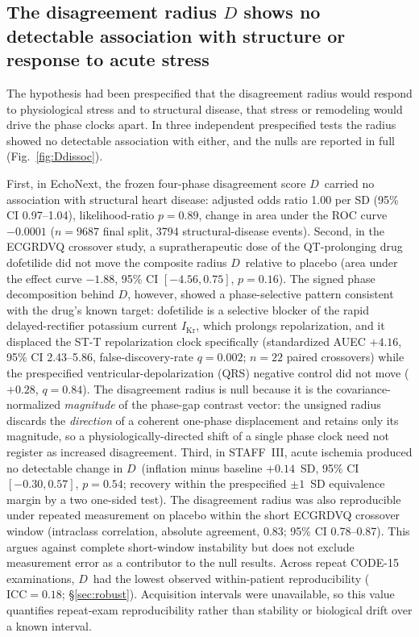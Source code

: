 \documentclass[11pt]{article}
\newcommand{\D}{\ensuremath{D}}
\begin{document}
\subsection{The disagreement radius \texorpdfstring{\D}{D} shows no detectable association with structure or response to acute stress}
\label{sec:dissociation}

The hypothesis had been prespecified that the disagreement radius would respond to
physiological stress and to structural disease, that stress or remodeling would drive
the phase clocks apart. In three independent prespecified tests the radius showed no
detectable association with either, and the nulls are reported in full (Fig.~\ref{fig:Ddissoc}).

First, in EchoNext, the frozen four-phase disagreement score \D\ carried no
association with structural heart disease: adjusted odds ratio \num{1.00} per SD (95\%
CI \numrange{0.97}{1.04}), likelihood-ratio $p=\num{0.89}$, change in area under the
ROC curve $-\num{0.0001}$ ($n=\num{9687}$ final split, \num{3794} structural-disease
events). Second, in the ECGRDVQ crossover study, a supratherapeutic dose of the
QT-prolonging drug dofetilide did not move the composite radius \D\ relative to placebo (area under the
effect curve $-\num{1.88}$, 95\% CI $[-\num{4.56},\num{0.75}]$, $p=\num{0.16}$).
The signed phase decomposition behind \D, however, showed a phase-selective
pattern consistent with the drug's known target: dofetilide is a selective blocker of the rapid delayed-rectifier
potassium current $I_{\text{Kr}}$, which prolongs repolarization, and it displaced the
ST-T repolarization clock specifically (standardized AUEC $+\num{4.16}$, 95\% CI
\numrange{2.43}{5.86}, false-discovery-rate $q=\num{0.002}$; $n=\num{22}$ paired
crossovers) while the prespecified ventricular-depolarization (QRS) negative control did
not move ($+\num{0.28}$, $q=\num{0.84}$). The disagreement radius is null because it is
the covariance-normalized \emph{magnitude} of the phase-gap contrast vector: the unsigned
radius discards the \emph{direction} of a coherent one-phase displacement and retains only
its magnitude, so a physiologically-directed shift of a single phase clock need not register
as increased disagreement.
Third, in STAFF~III, acute ischemia produced no detectable change in \D\ (inflation minus baseline
$+\num{0.14}$~SD, 95\% CI $[-\num{0.30},\num{0.57}]$, $p=\num{0.54}$; recovery within the
prespecified $\pm 1$~SD equivalence margin by a two one-sided test). The
disagreement radius was also reproducible under repeated measurement on placebo within the
short ECGRDVQ crossover window (intraclass correlation, absolute agreement, $\num{0.83}$;
95\% CI \numrange{0.78}{0.87}). This argues against complete short-window
instability but does not exclude measurement error as a contributor to the null
results. Across repeat CODE-15 examinations, \D\ had the lowest observed
within-patient reproducibility ($\mathrm{ICC}=\num{0.18}$;
\S\ref{sec:robust}). Acquisition intervals were unavailable, so this value
quantifies repeat-exam reproducibility rather than stability or biological drift
over a known interval.
\end{document}
